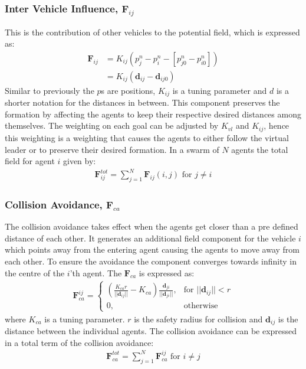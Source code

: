 \subsubsection{Inter Vehicle Influence, $\mathbf{F}_{ij}$}
This is the contribution of other vehicles to the potential field,
which is expressed as:
\begin{align}
\mathbf{F}_{ij} &= K_{ij}(p_{j}^n-p_i^n-[p_{j0}^n-p_{i0}^n])\\
&= K_{ij}(\mathbf{d}_{ij}-\mathbf{d}_{ij0})
\end{align}
Similar to previously the $p$s are positions, $K_{ij}$ is a tuning
parameter and $d$ is a shorter notation for the distances in between.
This component preserves the formation by affecting the agents to keep
their respective desired distances among themselves. The
weighting on each goal can be adjusted by $K_{vl}$ and $K_{ij}$, hence this weighting is a
weighting that causes the agents to either follow the virtual leader or to
preserve their desired formation.  In a swarm of $N$ agents the total
field for agent $i$ given by:
\begin{align}
\mathbf{F}_{ij}^{tot} = \sum\limits_{j=1}^N\mathbf{F}_{ij}(i,j) \text{ for } j\neq i
\end{align}

\subsubsection{Collision Avoidance, $\mathbf{F}_{ca}$}
The collision avoidance takes effect when the agents get closer than a
pre defined distance of each other. It generates an additional field
component for the vehicle $i$ which points away from the entering
agent causing the agents to move away from each other. To ensure the
avoidance the component converges towards infinity in the centre of
the $i$'th agent. The $\mathbf{F}_{ca}$ is expressed as:
\begin{align}
    \mathbf{F}_{ca}^{ij}= 
\begin{cases}
		\left(
    \frac{K_{ca}r}{||\mathbf{d}_{ij}||}-K_{ca}
		\right)
		\frac{\mathbf{d}_{ji}}{||\mathbf{d}_{ji}||}
		,& \text{for } ||\mathbf{d}_{ij}||<r\\
    0,              & \text{otherwise}
\end{cases}
\end{align}
where $K_{ca}$ is a tuning parameter. $r$ is the safety radius for
collision and $\mathbf{d}_{ij}$ is the distance between the individual agents.
The collision avoidance can be expressed in a total term of the
collision avoidance:
\begin{align}
\mathbf{F}_{ca}^{tot} = \sum\limits_{j=1}^N\mathbf{F}_{ca}^{ij} \text{ for } i\neq j
\end{align}

